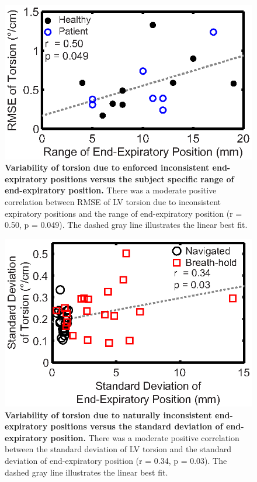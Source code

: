 	\begin{figure}
		\centering %
		\includegraphics{figures/torsionpaper/Fig8-RMSEpermVsBHrange}
		\caption[Variability of torsion due to enforced inconsistent end-expiratory positions versus the subject specific range of end-expiratory position]{\textbf{Variability of torsion due to enforced inconsistent end-expiratory positions versus the subject specific range of end-expiratory position.} There was a moderate positive correlation between RMSE of LV torsion due to inconsistent expiratory positions and the range of end-expiratory position (r = 0.50, p = 0.049). The dashed gray line illustrates the linear best fit.}
		\label{fig:perm_vs_posRange}
	\end{figure}
	
	\begin{figure}
		\centering %
		\includegraphics{figures/torsionpaper/Fig9-StdDevVsBH}
		\caption[Variability of torsion due to naturally inconsistent end-expiratory positions versus the standard deviation of end-expiratory position]{\textbf{Variability of torsion due to naturally inconsistent end-expiratory positions versus the standard deviation of end-expiratory position.} There was a moderate positive correlation between the standard deviation of LV torsion and the standard deviation of end-expiratory position (r = 0.34, p = 0.03). The dashed gray line illustrates the linear best fit.}
		\label{fig:torsion_vs_posStdDev}
	\end{figure}

